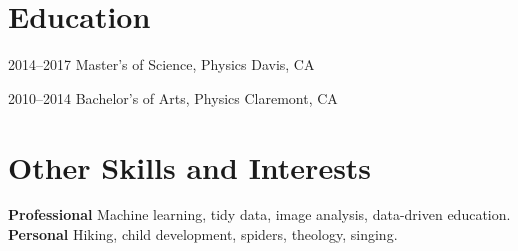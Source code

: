 \documentclass[]{cv-style}          %
\begin{document}
\section{Education}

\begin{entrylist}
\entry
{2014--2017}
{Master's of Science, Physics}
{Davis, CA}
{}

{\vspace{-0.2cm}}
\end{entrylist}
\begin{entrylist}
\entry
{2010--2014}
{Bachelor's of Arts, Physics}
{Claremont, CA}
{}
\end{entrylist}


\section{Other Skills and Interests}
  \vspace{-0.2cm}

  \textbf{Professional} \hspace{0.05cm} Machine learning, tidy data, image analysis, data-driven education. \\
  \textbf{Personal} \hspace{0.57cm} Hiking, child development, spiders, theology, singing.
  

\end{document}
